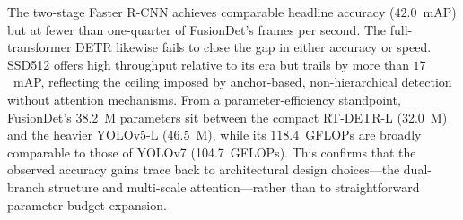 The two-stage Faster R-CNN achieves comparable headline accuracy ($42.0$~mAP)
but at fewer than one-quarter of FusionDet's frames per second. The
full-transformer DETR likewise fails to close the gap in either accuracy or
speed. SSD512 offers high throughput relative to its era but trails by more
than $17$~mAP, reflecting the ceiling imposed by anchor-based, non-hierarchical
detection without attention mechanisms. From a parameter-efficiency
standpoint, FusionDet's 38.2~M parameters sit between the compact
RT-DETR-L (32.0~M) and the heavier YOLOv5-L (46.5~M), while its
$118.4$~GFLOPs are broadly comparable to those of YOLOv7 (104.7~GFLOPs). This
confirms that the observed accuracy gains trace back to architectural
design choices—the dual-branch structure and multi-scale attention—rather than
to straightforward parameter budget expansion.

%
%
%
